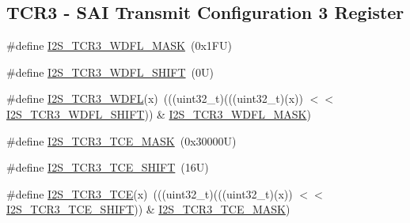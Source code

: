 \subsection*{T\+C\+R3 -\/ S\+AI Transmit Configuration 3 Register}
\begin{DoxyCompactItemize}
\item 
\#define \mbox{\hyperlink{group___i2_s___register___masks_ga49de2df89ebdb02cdb32c8a15f9ac7b4}{I2\+S\+\_\+\+T\+C\+R3\+\_\+\+W\+D\+F\+L\+\_\+\+M\+A\+SK}}~(0x1\+F\+U)
\item 
\#define \mbox{\hyperlink{group___i2_s___register___masks_ga984179c79c4fc833f32c031c69a33cd9}{I2\+S\+\_\+\+T\+C\+R3\+\_\+\+W\+D\+F\+L\+\_\+\+S\+H\+I\+FT}}~(0\+U)
\item 
\#define \mbox{\hyperlink{group___i2_s___register___masks_ga61d01cab13a8777ad0e326259faeb685}{I2\+S\+\_\+\+T\+C\+R3\+\_\+\+W\+D\+FL}}(x)~(((uint32\+\_\+t)(((uint32\+\_\+t)(x)) $<$$<$ \mbox{\hyperlink{group___i2_s___register___masks_ga984179c79c4fc833f32c031c69a33cd9}{I2\+S\+\_\+\+T\+C\+R3\+\_\+\+W\+D\+F\+L\+\_\+\+S\+H\+I\+FT}})) \& \mbox{\hyperlink{group___i2_s___register___masks_ga49de2df89ebdb02cdb32c8a15f9ac7b4}{I2\+S\+\_\+\+T\+C\+R3\+\_\+\+W\+D\+F\+L\+\_\+\+M\+A\+SK}})
\item 
\#define \mbox{\hyperlink{group___i2_s___register___masks_ga27bcb7b4d391b96f7fd8f566579bf7e2}{I2\+S\+\_\+\+T\+C\+R3\+\_\+\+T\+C\+E\+\_\+\+M\+A\+SK}}~(0x30000\+U)
\item 
\#define \mbox{\hyperlink{group___i2_s___register___masks_gab6791fd5b9271db39f4f91173ed3c30d}{I2\+S\+\_\+\+T\+C\+R3\+\_\+\+T\+C\+E\+\_\+\+S\+H\+I\+FT}}~(16\+U)
\item 
\#define \mbox{\hyperlink{group___i2_s___register___masks_ga1daa102ea7a383ef2562a20c3be3d06d}{I2\+S\+\_\+\+T\+C\+R3\+\_\+\+T\+CE}}(x)~(((uint32\+\_\+t)(((uint32\+\_\+t)(x)) $<$$<$ \mbox{\hyperlink{group___i2_s___register___masks_gab6791fd5b9271db39f4f91173ed3c30d}{I2\+S\+\_\+\+T\+C\+R3\+\_\+\+T\+C\+E\+\_\+\+S\+H\+I\+FT}})) \& \mbox{\hyperlink{group___i2_s___register___masks_ga27bcb7b4d391b96f7fd8f566579bf7e2}{I2\+S\+\_\+\+T\+C\+R3\+\_\+\+T\+C\+E\+\_\+\+M\+A\+SK}})
\end{DoxyCompactItemize}
